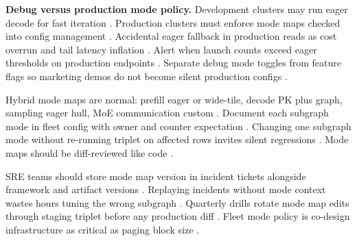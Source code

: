 \textbf{Debug versus production mode policy.} Development clusters may run eager decode for fast iteration \citep{patel2025llminference,yirage2026,chen2020compilerbasedhardw,kwon2023vllm,dlbook}. Production clusters must enforce mode maps checked into config management \citep{patel2025llminference,yirage2026,chen2020compilerbasedhardw,nvidia2024cudagraphs,dlbook}. Accidental eager fallback in production reads as cost overrun and tail latency inflation \citep{taxbreak2026,patel2025llminference,yirage2026,chen2020compilerbasedhardw,kwon2023vllm,memoryfloor2026,dlbook}. Alert when launch counts exceed eager thresholds on production endpoints \citep{taxbreak2026,yirage2026,chen2020compilerbasedhardw,patel2025llminference,dlbook}. Separate debug mode toggles from feature flags so marketing demos do not become silent production configs \citep{patel2025llminference,yirage2026,chen2020compilerbasedhardw,kwon2023vllm,dlbook}.

Hybrid mode maps are normal: prefill eager or wide-tile, decode PK plus graph, sampling eager hull, MoE communication custom \citep{nvidia2024cudagraphs,yirage2026,chen2020compilerbasedhardw,patel2025llminference,kwon2023vllm,liu2024deepseekv3,dao2022flashattention,taxbreak2026,memoryfloor2026,dlbook}. Document each subgraph mode in fleet config with owner and counter expectation \citep{patel2025llminference,yirage2026,chen2020compilerbasedhardw,dlbook}. Changing one subgraph mode without re-running triplet on affected rows invites silent regressions \citep{taxbreak2026,memoryfloor2026,yirage2026,chen2020compilerbasedhardw,patel2025llminference,kwon2023vllm,dlbook}. Mode maps should be diff-reviewed like code \citep{patel2025llminference,yirage2026,chen2020compilerbasedhardw,nvidia2024cudagraphs,dlbook}.

SRE teams should store mode map version in incident tickets alongside framework and artifact versions \citep{patel2025llminference,yirage2026,chen2020compilerbasedhardw,kwon2023vllm,dlbook}. Replaying incidents without mode context wastes hours tuning the wrong subgraph \citep{patel2025llminference,yirage2026,chen2020compilerbasedhardw,dlbook}. Quarterly drills rotate mode map edits through staging triplet before any production diff \citep{patel2025llminference,yirage2026,chen2020compilerbasedhardw,taxbreak2026,memoryfloor2026,kwon2023vllm,dlbook}. Fleet mode policy is co-design infrastructure as critical as paging block size \citep{kwon2023vllm,patel2025llminference,yirage2026,chen2020compilerbasedhardw,nvidia2024cudagraphs,dlbook}.

